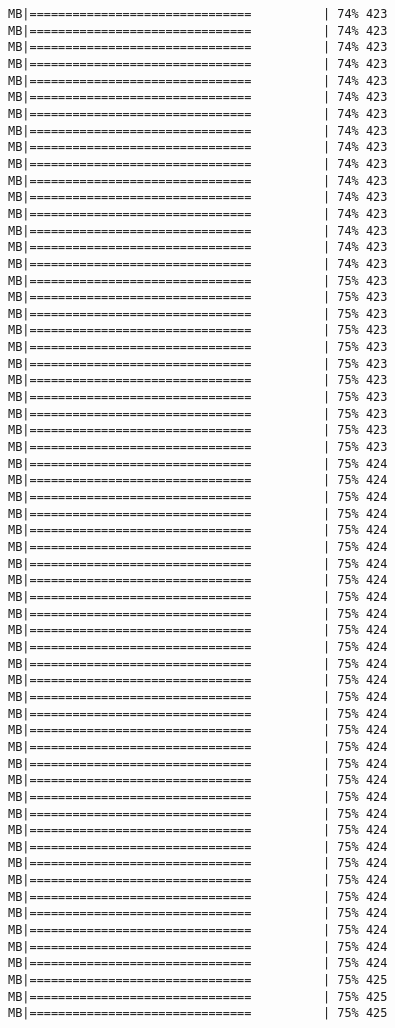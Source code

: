 \documentclass[
]{article}
\begin{document}
\begin{verbatim}
MB|===============================          | 74% 423 MB|===============================          | 74% 423 MB|===============================          | 74% 423 MB|===============================          | 74% 423 MB|===============================          | 74% 423 MB|===============================          | 74% 423 MB|===============================          | 74% 423 MB|===============================          | 74% 423 MB|===============================          | 74% 423 MB|===============================          | 74% 423 MB|===============================          | 74% 423 MB|===============================          | 74% 423 MB|===============================          | 74% 423 MB|===============================          | 74% 423 MB|===============================          | 74% 423 MB|===============================          | 74% 423 MB|===============================          | 75% 423 MB|===============================          | 75% 423 MB|===============================          | 75% 423 MB|===============================          | 75% 423 MB|===============================          | 75% 423 MB|===============================          | 75% 423 MB|===============================          | 75% 423 MB|===============================          | 75% 423 MB|===============================          | 75% 423 MB|===============================          | 75% 423 MB|===============================          | 75% 423 MB|===============================          | 75% 424 MB|===============================          | 75% 424 MB|===============================          | 75% 424 MB|===============================          | 75% 424 MB|===============================          | 75% 424 MB|===============================          | 75% 424 MB|===============================          | 75% 424 MB|===============================          | 75% 424 MB|===============================          | 75% 424 MB|===============================          | 75% 424 MB|===============================          | 75% 424 MB|===============================          | 75% 424 MB|===============================          | 75% 424 MB|===============================          | 75% 424 MB|===============================          | 75% 424 MB|===============================          | 75% 424 MB|===============================          | 75% 424 MB|===============================          | 75% 424 MB|===============================          | 75% 424 MB|===============================          | 75% 424 MB|===============================          | 75% 424 MB|===============================          | 75% 424 MB|===============================          | 75% 424 MB|===============================          | 75% 424 MB|===============================          | 75% 424 MB|===============================          | 75% 424 MB|===============================          | 75% 424 MB|===============================          | 75% 424 MB|===============================          | 75% 424 MB|===============================          | 75% 424 MB|===============================          | 75% 424 MB|===============================          | 75% 425 MB|===============================          | 75% 425 MB|===============================          | 75% 425 
\end{verbatim}
\end{document}
